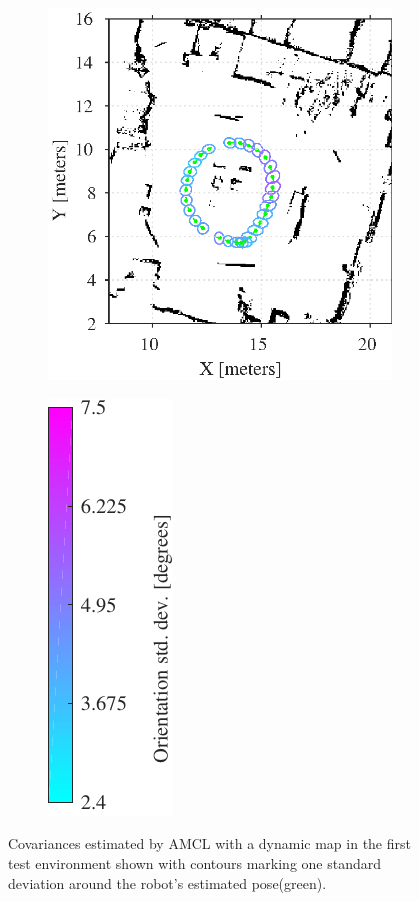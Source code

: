 \begin{figure}[htbp]
	\centering
	\begin{subfigure}[t]{0.55\textwidth}
		\includegraphics[scale=1.0]{chapters/evaluation/figures/localization_dynamic_map1}		
	\end{subfigure}
	\begin{subfigure}[t]{0.2\textwidth}
		\includegraphics[scale=1.0]{chapters/evaluation/figures/localization_std_color_bar-crop}
	\end{subfigure}
	\caption{Covariances estimated by AMCL with a dynamic map in the first test environment shown with contours marking one standard deviation around the robot's estimated pose(green).}
	\label{fig:amcl_covariance_dynamic1}
\end{figure}

